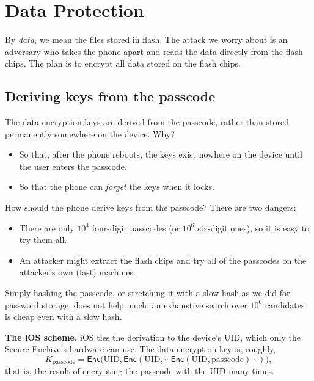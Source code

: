 \documentclass[
  letterpaper,
]{scrbook}
\providecommand{\tightlist}{%
  \setlength{\itemsep}{0pt}\setlength{\parskip}{0pt}}
\theoremstyle{definition}
\theoremstyle{plain}
\theoremstyle{plain}
\theoremstyle{remark}
\begin{document}
\section{Data Protection}\label{sec-ios-dp}

By \emph{data}, we mean the files stored in flash. The attack we worry
about is an adversary who takes the phone apart and reads the data
directly from the flash chips. The plan is to encrypt all data stored on
the flash chips.

\subsection{Deriving keys from the
passcode}\label{deriving-keys-from-the-passcode}

The data-encryption keys are derived from the passcode, rather than
stored permanently somewhere on the device. Why?

\begin{itemize}
\tightlist
\item
  So that, after the phone reboots, the keys exist nowhere on the device
  until the user enters the passcode.
\item
  So that the phone can \emph{forget} the keys when it locks.
\end{itemize}

How should the phone derive keys from the passcode? There are two
dangers:

\begin{itemize}
\tightlist
\item
  There are only \(10^4\) four-digit passcodes (or \(10^6\) six-digit
  ones), so it is easy to try them all.
\item
  An attacker might extract the flash chips and try all of the passcodes
  on the attacker's own (fast) machines.
\end{itemize}

Simply hashing the passcode, or stretching it with a slow hash as we did
for password storage, does not help much: an exhaustive search over
\(10^6\) candidates is cheap even with a slow hash.

\textbf{The iOS scheme.} iOS ties the derivation to the device's UID,
which only the Secure Enclave's hardware can use. The data-encryption
key is, roughly, \[
  K_\text{passcode} = \mathsf{Enc}\bigl(\text{UID}, \mathsf{Enc}(\text{UID}, \cdots \mathsf{Enc}(\text{UID}, \text{passcode}) \cdots)\bigr),
\] that is, the result of encrypting the passcode with the UID many
times.
\end{document}

